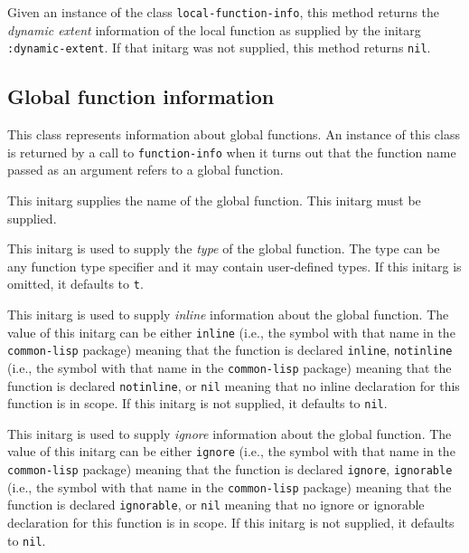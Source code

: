 Given an instance of the class \texttt{local-function-info}, this
method returns the \emph{dynamic extent} information of the local
function as supplied by the initarg \texttt{:dynamic-extent}.  If that
initarg was not supplied, this method returns \texttt{nil}.

\subsection{Global function information}


This class represents information about global functions.  An instance
of this class is returned by a call to \texttt{function-info} when it
turns out that the function name passed as an argument refers to a
global function.


This initarg supplies the name of the global function.  This initarg
must be supplied.


This initarg is used to supply the \emph{type} of the global function.
The type can be any function type specifier and it may contain
user-defined types.  If this initarg is omitted, it defaults to
\texttt{t}.


This initarg is used to supply \emph{inline} information about the
global function.  The value of this initarg can be either
\texttt{inline} (i.e., the symbol with that name in the
\texttt{common-lisp} package) meaning that the function is declared
\texttt{inline}, \texttt{notinline} (i.e., the symbol with that name
in the \texttt{common-lisp} package) meaning that the function is
declared \texttt{notinline}, or \texttt{nil} meaning that no inline
declaration for this function is in scope.  If this initarg is not
supplied, it defaults to \texttt{nil}.


This initarg is used to supply \emph{ignore} information about the
global function.  The value of this initarg can be either
\texttt{ignore} (i.e., the symbol with that name in the
\texttt{common-lisp} package) meaning that the function is declared
\texttt{ignore}, \texttt{ignorable} (i.e., the symbol with that name
in the \texttt{common-lisp} package) meaning that the function is
declared \texttt{ignorable}, or \texttt{nil} meaning that no ignore or
ignorable declaration for this function is in scope.  If this initarg
is not supplied, it defaults to \texttt{nil}.

